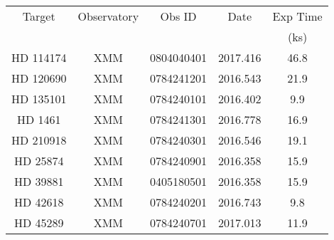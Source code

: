 
\begin{table}
  \centering
  \begin{tabular}{ccccc}
    \hline
    \hline
    Target & Observatory & Obs ID & Date & Exp Time \\
           &              &       &      & (ks) \\ 
    \hline       
HD 114174 & XMM & 0804040401 & 2017.416 &  46.8 \\ 
HD 120690 & XMM & 0784241201 & 2016.543 &  21.9 \\ 
HD 135101 & XMM & 0784240101 & 2016.402 &   9.9 \\ 
HD 1461 & XMM & 0784241301 & 2016.778 &  16.9 \\ 
HD 210918 & XMM & 0784240301 & 2016.546 &  19.1 \\ 
HD 25874 & XMM & 0784240901 & 2016.358 &  15.9 \\ 
HD 39881 & XMM & 0405180501 & 2016.358 &  15.9 \\ 
HD 42618 & XMM & 0784240201 & 2016.743 &   9.8 \\ 
HD 45289 & XMM & 0784240701 & 2017.013 &  11.9 \\ 

    \hline
  \end{tabular}
\end{table}
